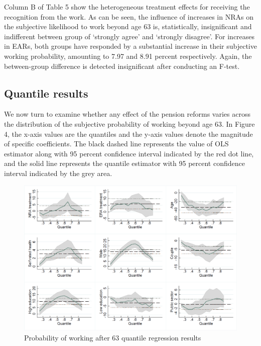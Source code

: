 \documentclass[a4paper]{article}
\begin{document}
Column B of Table 5 show the heterogeneous treatment effects for receiving the recognition from the work. As can be seen, the influence of increases in NRAs on the subjective likelihood to work beyond age 63 is, statistically, insignificant and indifferent between group of ‘strongly agree’ and ‘strongly disagree’. For increases in EARs, both groups have responded by a substantial increase in their subjective working probability, amounting to 7.97 and 8.91 percent respectively. Again, the between-group difference is detected insignificant after conducting an F-test. 



\subsection{Quantile results}

We now turn to examine whether any effect of the pension reforms varies across the distribution of the subjective probability of working beyond age 63. In Figure 4, the x-axis values are the quantiles and the y-axis values denote the magnitude of specific coefficients. The black dashed line represents the value of OLS estimator along with 95 percent confidence interval indicated by the red dot line, and the solid line represents the quantile estimator with 95 percent confidence interval indicated by the grey area. 

\begin{figure}[h] 
    \centering
    \includegraphics[width=1\linewidth]{figure3.png}
    \caption{Probability of working after 63 quantile regression results}
    \label{3}
\end{figure}
\end{document}
